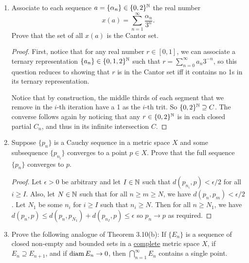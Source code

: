 \begin{enumerate}
\begin{proof}
    Notice that according to the definition, we must have $x_{n+1} \ge \sqrt[p]{\alpha}$ by the AM-GM inequality. Then let $x_1 > \sqrt[p]{\alpha}$ without loss of generality, then by a similar argument as above, $x_{n+1} < x_n$ so the sequence converges since it is monotonically decreasing and bounded below. It must converge to its unique fixed point at least $\sqrt[p]{\alpha}$, namely $x_n \to \sqrt[p]{\alpha}$.
\end{proof}

\item %
Associate to each sequence $a = \{\alpha_n\} \in \{0, 2\}^{\mathbb{N}}$ the real number
\[
	x(a) = \sum_{n=1}^{\infty} \frac{\alpha_n}{3^n}.
\]
Prove that the set of all $x(a)$ is the Cantor set.

\begin{proof}
    First, notice that for any real number $r \in [0, 1]$, we can associate a ternary representation $\{a_n\} \in \{0, 1, 2\}^{\mathbb{N}}$ such that $r = \sum_{n=0}^{\infty} a_n 3^{-n}$, so this question reduces to showing that $r$ is in the Cantor set iff it contains no 1s in its ternary representation.

    Notice that by construction, the middle thirds of each segment that we remove in the $i$-th iteration have a 1 as the $i$-th trit. So $\{0, 2\}^{\mathbb{N}} \supseteq C$. The converse follows again by noticing that any $r \in \{0, 2\}^{\mathbb{N}}$ is in each closed partial $C_n$, and thus in its infinite intersection $C$.
\end{proof}

\item %
Suppose $\{p_n\}$ is a Cauchy sequence in a metric space $X$ and some subsequence $\{p_{n_i}\}$ converges to a point $p \in X$. Prove that the full sequence $\{p_n\}$ converges to $p$.

\begin{proof}
    Let $\epsilon > 0$ be arbitrary and let $I \in \mathbb{N}$ such that $d(p_{n_i}, p) < \epsilon / 2$ for all $i \ge I$. Also, let $N \in \mathbb{N}$ such that for all $n \ge m \ge N$, we have $d(p_n, p_m) < \epsilon / 2$. Let $N_1$ be some $n_i$ for $i \ge I$ such that $n_i \ge N$. Then for all $n \ge N_1$, we have $d(p_n, p) \le d(p_n, p_{N_1}) + d(p_{n_I}, p) \le \epsilon$ so $p_n \to p$ as required.
\end{proof}

\item %
Prove the following analogue of Theorem 3.10(b): If $\{E_n\}$ is a sequence of closed non-empty and bounded sets in a \underline{complete} metric space $X$, if $E_n \supseteq E_{n+1}$, and if $\operatorname{diam} E_n \rightarrow 0$, then $\bigcap_{n=1}^{\infty} E_n$ contains a single point.


\end{enumerate}
